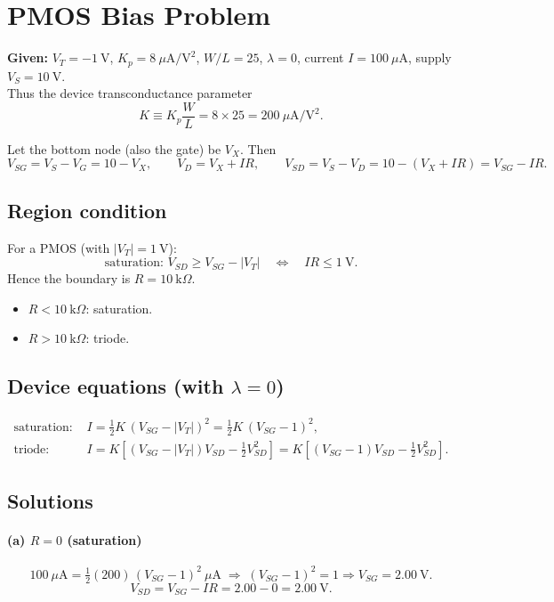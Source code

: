 \documentclass[12pt]{article}
\begin{document}
\section*{PMOS Bias Problem}

\textbf{Given:} \(V_T=-1~\text{V}\), \(K_p=8~\mu\text{A}/\text{V}^2\), \(W/L=25\), \(\lambda=0\), current \(I=100~\mu\text{A}\), supply \(V_S=10~\text{V}\).\\
Thus the device transconductance parameter
\[
K \equiv K_p\frac{W}{L}= 8\times 25=200~\mu\text{A}/\text{V}^2 .
\]

Let the bottom node (also the gate) be \(V_X\). Then
\[
V_{SG}=V_S-V_G=10-V_X, \qquad
V_D=V_X+IR, \qquad
V_{SD}=V_S-V_D=10-(V_X+IR)=V_{SG}-IR.
\]

\subsection*{Region condition}
For a PMOS (with \(|V_T|=1~\text{V}\)):
\[
\text{saturation: } V_{SD}\ge V_{SG}-|V_T| \quad\Longleftrightarrow\quad IR\le 1~\text{V}.
\]
Hence the boundary is \(R=10~\text{k}\Omega\).
\begin{itemize}
\item \(R<10~\text{k}\Omega\): saturation.
\item \(R>10~\text{k}\Omega\): triode.
\end{itemize}

\subsection*{Device equations (with \(\lambda=0\))}
\begin{align*}
\text{saturation: } & I=\tfrac12 K\,(V_{SG}-|V_T|)^2
= \tfrac12 K\,(V_{SG}-1)^2,\\[2mm]
\text{triode: } & I=K\!\left[(V_{SG}-|V_T|)V_{SD}-\tfrac12 V_{SD}^2\right]
=K\!\left[(V_{SG}-1)V_{SD}-\tfrac12 V_{SD}^2\right].
\end{align*}

\subsection*{Solutions}
\paragraph{(a) \(R=0\) (saturation)}
\[
100~\mu\text{A}=\tfrac12(200)\,(V_{SG}-1)^2~\mu\text{A}
\;\Rightarrow\; (V_{SG}-1)^2=1 \Rightarrow V_{SG}=2.00~\text{V}.
\]
\[
V_{SD}=V_{SG}-IR=2.00-0=2.00~\text{V}.
\]
\end{document}
